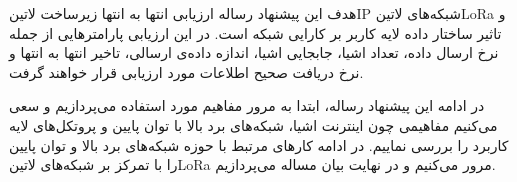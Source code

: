 هدف این پیشنهاد رساله ارزیابی انتها به انتها زیرساخت ‌لاتین{IP} شبکه‌های ‌لاتین{LoRa}
و تاثیر ساختار داده لایه کاربر بر کارایی شبکه
است.
در این ارزیابی پارامترهایی از جمله نرخ ارسال داده، تعداد اشیا، جابجایی اشیا، اندازه داده‌ی ارسالی، تاخیر انتها به انتها و
نرخ دریافت صحیح اطلاعات مورد ارزیابی قرار خواهند گرفت.

در ادامه این پیشنهاد رساله، ابتدا به مرور مفاهیم مورد استفاده می‌پردازیم و سعی می‌کنیم مفاهیمی چون اینترنت اشیا، شبکه‌های برد بالا با توان پایین و
پروتکل‌های لایه کاربرد را بررسی نماییم. در ادامه
کارهای مرتبط با حوزه شبکه‌های برد بالا و توان پایین را با تمرکز بر شبکه‌های ‌لاتین{LoRa} مرور می‌کنیم و در نهایت بیان مساله می‌پردازیم.

